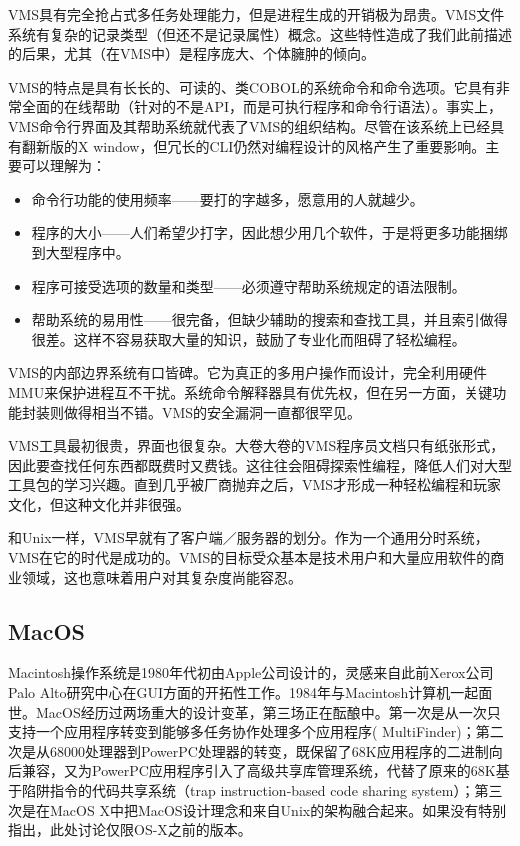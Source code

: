 \documentclass[11pt,oneside]{book}
\begin{document}
\begin{common-format}
VMS具有完全抢占式多任务处理能力，但是进程生成的开销极为昂贵。VMS文件系统有复杂的记录类型（但还不是记录属性）概念。这些特性造成了我们此前描述的后果，尤其（在VMS中）是程序庞大、个体臃肿的倾向。

VMS的特点是具有长长的、可读的、类COBOL的系统命令和命令选项。它具有非常全面的在线帮助（针对的不是API，而是可执行程序和命令行语法）。事实上，VMS命令行界面及其帮助系统就代表了VMS的组织结构。尽管在该系统上已经具有翻新版的X window，但冗长的CLI仍然对编程设计的风格产生了重要影响。主要可以理解为：

\begin{itemize}
\item 命令行功能的使用频率——要打的字越多，愿意用的人就越少。
\item 程序的大小——人们希望少打字，因此想少用几个软件，于是将更多功能捆绑到大型程序中。
\item 程序可接受选项的数量和类型——必须遵守帮助系统规定的语法限制。
\item 帮助系统的易用性——很完备，但缺少辅助的搜索和查找工具，并且索引做得很差。这样不容易获取大量的知识，鼓励了专业化而阻碍了轻松编程。
\end{itemize}

VMS的内部边界系统有口皆碑。它为真正的多用户操作而设计，完全利用硬件MMU来保护进程互不干扰。系统命令解释器具有优先权，但在另一方面，关键功能封装则做得相当不错。VMS的安全漏洞一直都很罕见。

VMS工具最初很贵，界面也很复杂。大卷大卷的VMS程序员文档只有纸张形式，因此要查找任何东西都既费时又费钱。这往往会阻碍探索性编程，降低人们对大型工具包的学习兴趣。直到几乎被厂商抛弃之后，VMS才形成一种轻松编程和玩家文化，但这种文化并非很强。

和Unix一样，VMS早就有了客户端／服务器的划分。作为一个通用分时系统，VMS在它的时代是成功的。VMS的目标受众基本是技术用户和大量应用软件的商业领域，这也意味着用户对其复杂度尚能容忍。


\subsection{MacOS}
Macintosh操作系统是1980年代初由Apple公司设计的，灵感来自此前Xerox公司Palo Alto研究中心在GUI方面的开拓性工作。1984年与Macintosh计算机一起面世。MacOS经历过两场重大的设计变革，第三场正在酝酿中。第一次是从一次只支持一个应用程序转变到能够多任务协作处理多个应用程序( MultiFinder)；第二次是从68000处理器到PowerPC处理器的转变，既保留了68K应用程序的二进制向后兼容，又为PowerPC应用程序引入了高级共享库管理系统，代替了原来的68K基于陷阱指令的代码共享系统（trap instruction-based code sharing system）；第三次是在MacOS X中把MacOS设计理念和来自Unix的架构融合起来。如果没有特别指出，此处讨论仅限OS-X之前的版本。


\end{common-format}
\end{document}
